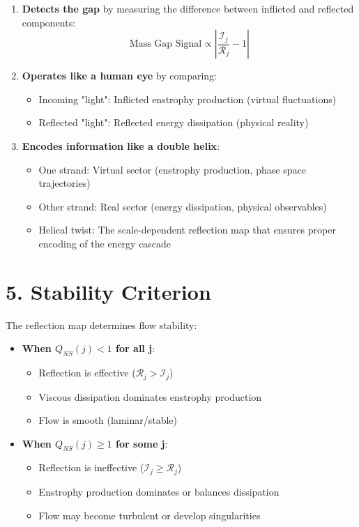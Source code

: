 \documentclass[11pt]{article}
\begin{document}
\begin{enumerate}
\item \textbf{Detects the gap} by measuring the difference between inflicted and reflected components:
  \[
  \text{Mass Gap Signal} \propto \left| \frac{\mathcal{I}_j}{\mathcal{R}_j} - 1 \right|
  \]

\item \textbf{Operates like a human eye} by comparing:
  \begin{itemize}
  \item Incoming "light": Inflicted enstrophy production (virtual fluctuations)
  \item Reflected "light": Reflected energy dissipation (physical reality)
  \end{itemize}

\item \textbf{Encodes information like a double helix}:
  \begin{itemize}
  \item One strand: Virtual sector (enstrophy production, phase space trajectories)
  \item Other strand: Real sector (energy dissipation, physical observables)
  \item Helical twist: The scale-dependent reflection map that ensures proper encoding of the energy cascade
  \end{itemize}
\end{enumerate}

\section{5. Stability Criterion}

The reflection map determines flow stability:

\begin{itemize}
\item \textbf{When \(Q_{NS}(j) < 1\) for all j}:
  \begin{itemize}
  \item Reflection is effective (\(\mathcal{R}_j > \mathcal{I}_j\))
  \item Viscous dissipation dominates enstrophy production
  \item Flow is smooth (laminar/stable)
  \end{itemize}
\item \textbf{When \(Q_{NS}(j) \geq 1\) for some j}:
  \begin{itemize}
  \item Reflection is ineffective (\(\mathcal{I}_j \geq \mathcal{R}_j\))
  \item Enstrophy production dominates or balances dissipation
  \item Flow may become turbulent or develop singularities
  \end{itemize}
\end{itemize}
\end{document}
